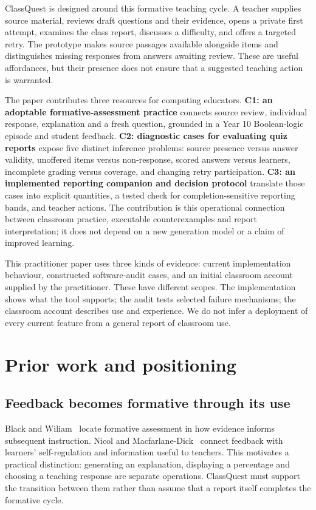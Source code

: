 ClassQuest is designed around this formative teaching cycle. A teacher supplies source material, reviews draft questions and their evidence, opens a private first attempt, examines the class report, discusses a difficulty, and offers a targeted retry. The prototype makes source passages available alongside items and distinguishes missing responses from answers awaiting review. These are useful affordances, but their presence does not ensure that a suggested teaching action is warranted.

The paper contributes three resources for computing educators. \textbf{C1: an adoptable formative-assessment practice} connects source review, individual response, explanation and a fresh question, grounded in a Year 10 Boolean-logic episode and student feedback. \textbf{C2: diagnostic cases for evaluating quiz reports} expose five distinct inference problems: source presence versus answer validity, unoffered items versus non-response, scored answers versus learners, incomplete grading versus coverage, and changing retry participation. \textbf{C3: an implemented reporting companion and decision protocol} translate those cases into explicit quantities, a tested check for completion-sensitive reporting bands, and teacher actions. The contribution is this operational connection between classroom practice, executable counterexamples and report interpretation; it does not depend on a new generation model or a claim of improved learning.

This practitioner paper uses three kinds of evidence: current implementation behaviour, constructed software-audit cases, and an initial classroom account supplied by the practitioner. These have different scopes. The implementation shows what the tool supports; the audit tests selected failure mechanisms; the classroom account describes use and experience. We do not infer a deployment of every current feature from a general report of classroom use.

\section{Prior work and positioning}
\subsection{Feedback becomes formative through its use}
Black and Wiliam~\cite{black} locate formative assessment in how evidence informs subsequent instruction. Nicol and Macfarlane-Dick~\cite{nicol} connect feedback with learners' self-regulation and information useful to teachers. This motivates a practical distinction: generating an explanation, displaying a percentage and choosing a teaching response are separate operations. ClassQuest must support the transition between them rather than assume that a report itself completes the formative cycle.

